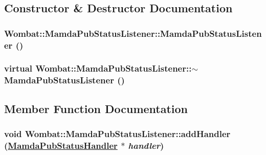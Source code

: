 \subsection{Constructor \& Destructor Documentation}
\hypertarget{classWombat_1_1MamdaPubStatusListener_85f58413cd22007f86b9b8c061812f05}{
\subsubsection[MamdaPubStatusListener]{\setlength{\rightskip}{0pt plus 5cm}Wombat::Mamda\-Pub\-Status\-Listener::Mamda\-Pub\-Status\-Listener ()}}
\label{classWombat_1_1MamdaPubStatusListener_85f58413cd22007f86b9b8c061812f05}


\hypertarget{classWombat_1_1MamdaPubStatusListener_03f02d6928f876a1d35c39522da47f8d}{
\subsubsection[$\sim$MamdaPubStatusListener]{\setlength{\rightskip}{0pt plus 5cm}virtual Wombat::Mamda\-Pub\-Status\-Listener::$\sim$Mamda\-Pub\-Status\-Listener ()}}
\label{classWombat_1_1MamdaPubStatusListener_03f02d6928f876a1d35c39522da47f8d}




\subsection{Member Function Documentation}
\hypertarget{classWombat_1_1MamdaPubStatusListener_8fd61b0b01ae58ac9aa0087ef361206c}{
\subsubsection[addHandler]{\setlength{\rightskip}{0pt plus 5cm}void Wombat::Mamda\-Pub\-Status\-Listener::add\-Handler (\hyperlink{classWombat_1_1MamdaPubStatusHandler}{Mamda\-Pub\-Status\-Handler} $\ast$ {\em handler})}}
\label{classWombat_1_1MamdaPubStatusListener_8fd61b0b01ae58ac9aa0087ef361206c}



